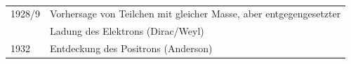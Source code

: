 	\\
	\begin{tabular}{l l}
		1928/9 & Vorhersage von Teilchen mit gleicher Masse, aber entgegengesetzter \\
		& Ladung des Elektrons (Dirac/Weyl) \\
		1932 & Entdeckung des Positrons (Anderson)
	\end{tabular}